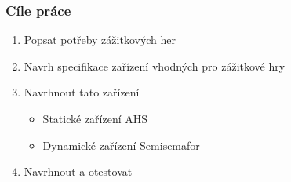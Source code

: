 \documentclass[%
  12pt,       				%
	t,                  %
	aspectratio=1610,   %
	unicode,						%
]{beamer}				    	%
\begin{document}
\disablenavigationsymbols

\maketitle

\begin{frame} 
	\frametitle{Cíle práce}
	\begin{enumerate}
		\item Popsat potřeby zážitkových her
		\item Navrh specifikace zařízení vhodných pro zážitkové hry 
		\item Navrhnout tato zařízení
		\begin{itemize}
			\item Statické zařízení AHS
			\item Dynamické zařízení Semisemafor 
		\end{itemize}
		\item Navrhnout a otestovat
	\end{enumerate}
\end{frame}
\end{document}
